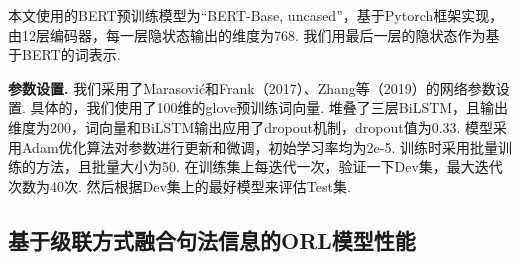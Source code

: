 本文使用的BERT预训练模型为“BERT-Base, uncased”，基于Pytorch框架实现，由12层编码器，每一层隐状态输出的维度为768. 我们用最后一层的隐状态作为基于BERT的词表示.

\textbf{参数设置. }
我们采用了Marasovi{\'c}和Frank（2017）、Zhang等（2019）的网络参数设置. 具体的，我们使用了100维的glove预训练词向量. 堆叠了三层BiLSTM，且输出维度为200，词向量和BiLSTM输出应用了dropout机制，dropout值为0.33. 模型采用Adam优化算法对参数进行更新和微调，初始学习率均为2e-5. 训练时采用批量训练的方法，且批量大小为50. 在训练集上每迭代一次，验证一下Dev集，最大迭代次数为40次. 然后根据Dev集上的最好模型来评估Test集.


\subsection{基于级联方式融合句法信息的ORL模型性能}

